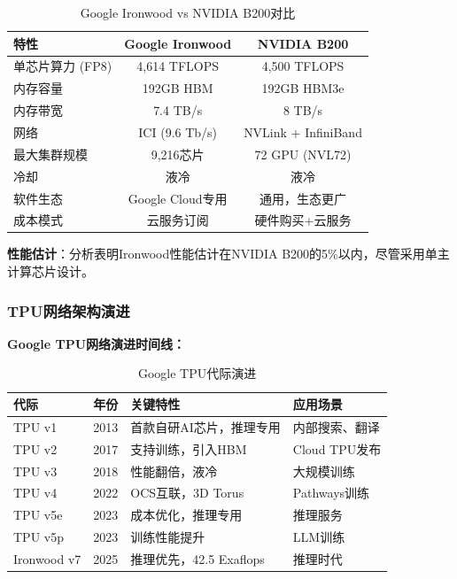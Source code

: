 \begin{table}[htbp]
\centering
\caption{Google Ironwood vs NVIDIA B200对比}
\begin{tabular}{|l|c|c|}
\hline
\textbf{特性} & \textbf{Google Ironwood} & \textbf{NVIDIA B200} \\
\hline
单芯片算力 (FP8) & 4,614 TFLOPS & 4,500 TFLOPS \\
内存容量 & 192GB HBM & 192GB HBM3e \\
内存带宽 & 7.4 TB/s & 8 TB/s \\
网络 & ICI (9.6 Tb/s) & NVLink + InfiniBand \\
最大集群规模 & 9,216芯片 & 72 GPU (NVL72) \\
冷却 & 液冷 & 液冷 \\
软件生态 & Google Cloud专用 & 通用，生态更广 \\
成本模式 & 云服务订阅 & 硬件购买+云服务 \\
\hline
\end{tabular}
\end{table}

\textbf{性能估计}：分析表明Ironwood性能估计在NVIDIA B200的5\%以内，尽管采用单主计算芯片设计。

\subsubsection{TPU网络架构演进}

\textbf{Google TPU网络演进时间线：}

\begin{table}[htbp]
\centering
\caption{Google TPU代际演进}
\begin{tabular}{|l|l|l|l|}
\hline
\textbf{代际} & \textbf{年份} & \textbf{关键特性} & \textbf{应用场景} \\
\hline
TPU v1 & 2013 & 首款自研AI芯片，推理专用 & 内部搜索、翻译 \\
TPU v2 & 2017 & 支持训练，引入HBM & Cloud TPU发布 \\
TPU v3 & 2018 & 性能翻倍，液冷 & 大规模训练 \\
TPU v4 & 2022 & OCS互联，3D Torus & Pathways训练 \\
TPU v5e & 2023 & 成本优化，推理专用 & 推理服务 \\
TPU v5p & 2023 & 训练性能提升 & LLM训练 \\
Ironwood v7 & 2025 & 推理优先，42.5 Exaflops & 推理时代 \\
\hline
\end{tabular}
\end{table}

